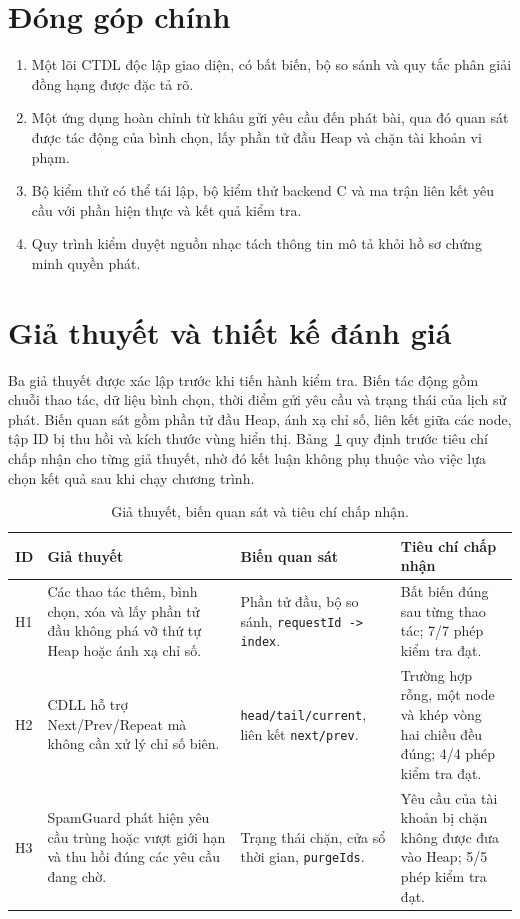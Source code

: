 \documentclass[12pt,a4paper,twoside,openright]{report}
\newcommand{\code}[1]{\texttt{#1}}
\begin{document}
\section{Đóng góp chính}
\begin{enumerate}
  \item Một lõi CTDL độc lập giao diện, có bất biến, bộ so sánh và quy tắc phân giải đồng hạng
  được đặc tả rõ.
  \item Một ứng dụng hoàn chỉnh từ khâu gửi yêu cầu đến phát bài, qua đó quan sát được tác
  động của bình chọn, lấy phần tử đầu Heap và chặn tài khoản vi phạm.
  \item Bộ kiểm thử có thể tái lập, bộ kiểm thử backend C và ma trận liên kết yêu cầu với
  phần hiện thực và kết quả kiểm tra.
  \item Quy trình kiểm duyệt nguồn nhạc tách thông tin mô tả khỏi hồ sơ chứng minh quyền phát.
\end{enumerate}

\section{Giả thuyết và thiết kế đánh giá}
Ba giả thuyết được xác lập trước khi tiến hành kiểm tra. Biến tác động gồm chuỗi thao tác,
dữ liệu bình chọn, thời điểm gửi yêu cầu và trạng thái của lịch sử phát. Biến quan sát gồm
phần tử đầu Heap, ánh xạ chỉ số, liên kết giữa các node, tập ID bị thu hồi và kích thước
vùng hiển thị. Bảng~\ref{tab:hypotheses} quy định trước tiêu chí chấp nhận cho từng giả
thuyết, nhờ đó kết luận không phụ thuộc vào việc lựa chọn kết quả sau khi chạy chương trình.

\begin{table}[h]
\centering\small
\begin{tabularx}{\textwidth}{@{}p{1cm}p{4.65cm}p{4.25cm}X@{}}
\toprule
\textbf{ID} & \textbf{Giả thuyết} & \textbf{Biến quan sát} & \textbf{Tiêu chí chấp nhận}\\
\midrule
H1 & Các thao tác thêm, bình chọn, xóa và lấy phần tử đầu không phá vỡ thứ tự Heap hoặc
ánh xạ chỉ số. & Phần tử đầu, bộ so sánh, \code{requestId -> index}. & Bất biến đúng sau
từng thao tác; 7/7 phép kiểm tra đạt.\\
H2 & CDLL hỗ trợ Next/Prev/Repeat mà không cần xử lý chỉ số biên. &
\code{head/tail/current}, liên kết \code{next/prev}. & Trường hợp rỗng, một node và khép
vòng hai chiều đều đúng; 4/4 phép kiểm tra đạt.\\
H3 & SpamGuard phát hiện yêu cầu trùng hoặc vượt giới hạn và thu hồi đúng các yêu cầu đang
chờ. & Trạng thái chặn, cửa sổ thời gian, \code{purgeIds}. & Yêu cầu của tài khoản bị chặn
không được đưa vào Heap; 5/5 phép kiểm tra đạt.\\
\bottomrule
\end{tabularx}
\caption{Giả thuyết, biến quan sát và tiêu chí chấp nhận.}
\label{tab:hypotheses}
\end{table}
\end{document}
